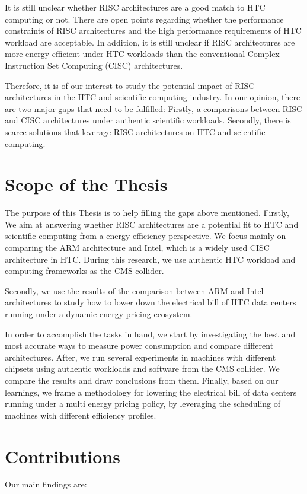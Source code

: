 It is still unclear whether RISC architectures are a good match to HTC
computing or not. There are open points regarding whether the performance 
constraints of RISC architectures and the high performance requirements of HTC 
workload are acceptable. In addition, it is still unclear if RISC architectures
are more energy efficient under HTC workloads than the conventional Complex 
Instruction Set Computing (CISC) architectures.

Therefore, it is of our interest to study the potential impact of RISC architectures in 
the HTC and scientific computing industry. In our opinion, there are two major
gaps that need to be fulfilled: Firstly, a comparisons between
RISC and CISC architectures under authentic scientific workloads. Secondly,
there is scarce solutions that leverage RISC architectures on HTC and scientific
computing.
 

\section{Scope of the Thesis}
The purpose of this Thesis is to help filling the gaps above mentioned. Firstly, We aim at answering whether RISC architectures
are a potential fit to HTC and scientific computing from a energy efficiency
perspective. We focus mainly on comparing the ARM architecture and Intel, which is a widely used CISC architecture in HTC. During this research, we
use authentic HTC workload and computing frameworks as the CMS collider. 

Secondly, we use the results of the comparison between ARM and Intel architectures to study how to lower down the electrical bill of HTC data centers running under a dynamic energy
pricing ecosystem.


In order to accomplish the tasks in hand, we start by investigating the best
and most accurate ways to measure power consumption and compare different
architectures. After, we run several experiments in machines with different chipsets using
authentic workloads and software from the CMS collider. We compare the results and
draw conclusions from them. Finally, based on our learnings, we frame a methodology for
lowering the electrical bill of data centers running under a multi energy
pricing policy, by leveraging the scheduling of machines with different
efficiency profiles.  

   
\section{Contributions}
Our main findings are: 

